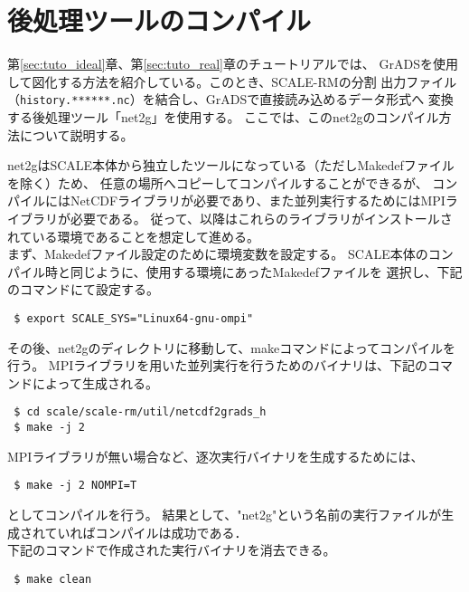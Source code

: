 \section{後処理ツールのコンパイル} \label{sec:source_net2g}

第\ref{sec:tuto_ideal}章、第\ref{sec:tuto_real}章のチュートリアルでは、
GrADSを使用して図化する方法を紹介している。このとき、SCALE-RMの分割
出力ファイル（\verb|history.******.nc|）を結合し、GrADSで直接読み込めるデータ形式へ
変換する後処理ツール「net2g」を使用する。
ここでは、このnet2gのコンパイル方法について説明する。

net2gはSCALE本体から独立したツールになっている（ただしMakedefファイルを除く）ため、
任意の場所へコピーしてコンパイルすることができるが、
コンパイルにはNetCDFライブラリが必要であり、また並列実行するためにはMPIライブラリが必要である。
従って、以降はこれらのライブラリがインストールされている環境であることを想定して進める。\\


まず、Makedefファイル設定のために環境変数を設定する。
SCALE本体のコンパイル時と同じように、使用する環境にあったMakedefファイルを
選択し、下記のコマンドにて設定する。

\begin{verbatim}
 $ export SCALE_SYS="Linux64-gnu-ompi"
\end{verbatim}

その後、net2gのディレクトリに移動して、makeコマンドによってコンパイルを行う。
MPIライブラリを用いた並列実行を行うためのバイナリは、下記のコマンドによって生成される。
\begin{verbatim}
 $ cd scale/scale-rm/util/netcdf2grads_h
 $ make -j 2
\end{verbatim}
MPIライブラリが無い場合など、逐次実行バイナリを生成するためには、\\
\begin{verbatim}
 $ make -j 2 NOMPI=T
\end{verbatim}
としてコンパイルを行う。
結果として、"net2g"という名前の実行ファイルが生成されていればコンパイルは成功である．\\

下記のコマンドで作成された実行バイナリを消去できる。
\begin{verbatim}
 $ make clean
\end{verbatim}


